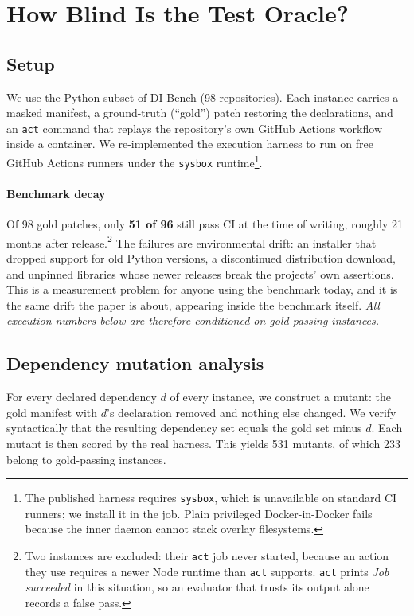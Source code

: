 \documentclass[10pt,conference]{IEEEtran}
\newcommand{\dibench}{DI-Bench}
\newcommand{\code}[1]{\texttt{\small #1}}
\begin{document}
\section{How Blind Is the Test Oracle?}
\label{sec:blindness}

\subsection{Setup}

We use the Python subset of \dibench{} (98 repositories). Each instance
carries a masked manifest, a ground-truth (``gold'') patch restoring the
declarations, and an \code{act} command that replays the repository's own
GitHub Actions workflow inside a container. We re-implemented the
execution harness to run on free GitHub Actions runners under the
\code{sysbox} runtime\footnote{The published harness requires
\code{sysbox}, which is unavailable on standard CI runners; we install it
in the job. Plain privileged Docker-in-Docker fails because the inner
daemon cannot stack overlay filesystems.}.

\paragraph*{Benchmark decay}
Of 98 gold patches, only \textbf{51 of 96} still pass CI at the time of
writing, roughly 21 months after release.\footnote{Two instances are
excluded: their \code{act} job never started, because an action they use
requires a newer Node runtime than \code{act} supports. \code{act} prints
\emph{Job succeeded} in this situation, so an evaluator that trusts its
output alone records a false pass.} The failures are environmental drift:
an installer that dropped support for old Python versions, a discontinued
distribution download, and unpinned libraries whose newer releases break
the projects' own assertions. This is a measurement problem for anyone
using the benchmark today, and it is the same drift the paper is about,
appearing inside the benchmark itself. \emph{All execution numbers below
are therefore conditioned on gold-passing instances.}

\subsection{Dependency mutation analysis}

For every declared dependency $d$ of every instance, we construct a
mutant: the gold manifest with $d$'s declaration removed and nothing else
changed. We verify syntactically that the resulting dependency set equals
the gold set minus $d$. Each mutant is then scored by the real harness.
This yields 531 mutants, of which 233 belong to gold-passing instances.
\end{document}
